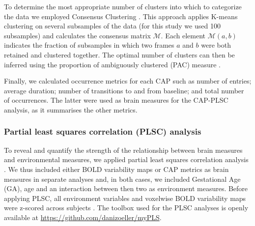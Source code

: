 To determine the most appropriate number of clusters into which to categorize the data we employed Consensus Clustering \citep{Monti2003}. This approach applies K-means clustering on several subsamples of the data (for this study we used 100 subsamples) and calculates the consensus matrix $\mathcal{M}$. Each element $\mathcal{M}(a,b)$ indicates the fraction of subsamples in which two frames $a$ and $b$ were both retained and clustered together. The optimal number of clusters can then be inferred using the proportion of ambiguously  clustered (PAC) measure \citep{Senbabaoglu2014}. 

Finally, we calculated occurrence metrics for each CAP such as number of entries; average duration; number of transitions to and from baseline; and total number of occurrences. The latter were used as brain measures for the CAP-PLSC analysis, as it summarises the other metrics.



\subsubsection{Partial least squares correlation (PLSC) analysis}

 To reveal and quantify the strength of the relationship between brain measures and environmental measures, we applied partial least squares correlation analysis \citep{McIntosh2004, Krishnan2011}. We thus included either BOLD variability maps or CAP metrics as brain measures in separate analyses and, in both cases, we included Gestational Age (GA), age and an interaction between then two as environment measures. Before applying PLSC, all environment variables and voxelwise BOLD variability maps were z-scored across subjects \citep{Krishnan2011}. The toolbox used for the PLSC analyses is openly available at \href{https://github.com/danizoeller/myPLS}{https://github.com/danizoeller/myPLS}.


